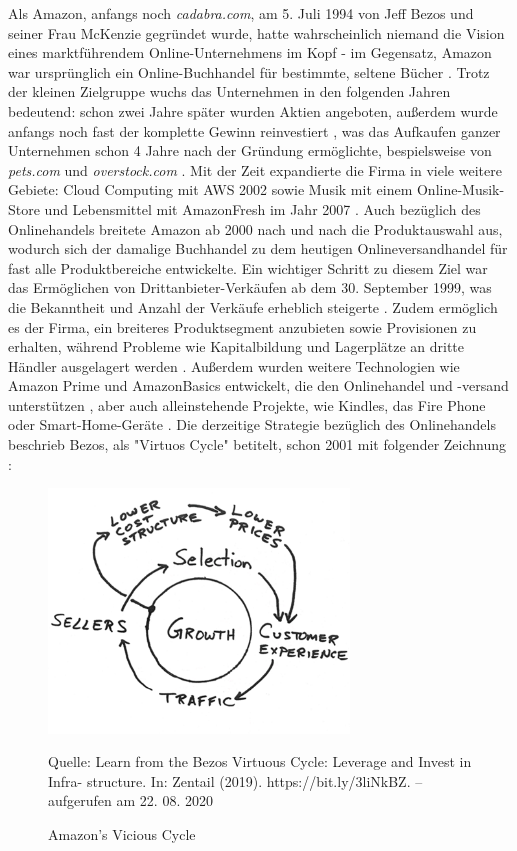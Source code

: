 \documentclass[a4paper, 12pt]{scrartcl}
\newcommand*{\bildquelle}{%
  \footnotesize Quelle:
}
\begin{document}
        
        Als Amazon, anfangs noch \emph{cadabra.com}, am 5. Juli 1994 von Jeff Bezos und seiner Frau McKenzie gegründet wurde, hatte wahrscheinlich niemand die Vision eines marktführendem Online-Unternehmens im Kopf - im Gegensatz, Amazon war ursprünglich ein Online-Buchhandel für bestimmte, seltene Bücher \cite[S. 17]{Graf}. Trotz der kleinen Zielgruppe wuchs das Unternehmen in den folgenden Jahren bedeutend: schon zwei Jahre später wurden Aktien angeboten, außerdem wurde anfangs noch fast der komplette Gewinn reinvestiert \cite{Rosoff}, was das Aufkaufen ganzer Unternehmen schon 4 Jahre nach der Gründung ermöglichte, bespielsweise von \emph{pets.com} und \emph{overstock.com} \cite{ChannelAdvisor}. Mit der Zeit expandierte die Firma in viele weitere Gebiete: Cloud Computing mit \ac{AWS} 2002 sowie Musik mit einem Online-Musik-Store und Lebensmittel mit AmazonFresh im Jahr 2007 \cite{Sherman, ChannelAdvisor}. Auch bezüglich des Onlinehandels breitete Amazon ab 2000 nach und nach die Produktauswahl aus, wodurch sich der damalige Buchhandel zu dem heutigen Onlineversandhandel für fast alle Produktbereiche entwickelte. Ein wichtiger Schritt zu diesem Ziel war das Ermöglichen von Drittanbieter-Verkäufen ab dem 30. September 1999, was die Bekanntheit und Anzahl der Verkäufe erheblich steigerte \cite{Sherman}. Zudem ermöglich es der Firma, ein breiteres Produktsegment anzubieten sowie Provisionen zu erhalten, während Probleme wie Kapitalbildung und Lagerplätze an dritte Händler ausgelagert werden \cite[S. 50]{evilcom}. Außerdem wurden weitere Technologien wie Amazon Prime und AmazonBasics entwickelt, die den Onlinehandel und -versand unterstützen \cite{ChannelAdvisor}, aber auch alleinstehende Projekte, wie Kindles, das Fire Phone oder Smart-Home-Geräte \cite{Sherman}.
Die derzeitige Strategie bezüglich des Onlinehandels beschrieb Bezos, als "Virtuos Cycle" betitelt, schon 2001  mit folgender Zeichnung \cite{zentail}:

\begin{figure}[h]
    \begin{center}
        \includegraphics[width=8cm]{media/Fabian-vicious-cycle.png}
        \caption{Amazon's Vicious Cycle}
        \label{vicious-cycle}
        \bildquelle Learn from the Bezos Virtuous Cycle: Leverage and Invest in Infra-
structure. In: Zentail (2019). https://bit.ly/3liNkBZ. – aufgerufen am 22. 08. 2020

    \end{center}
\end{figure} 
\end{document}
